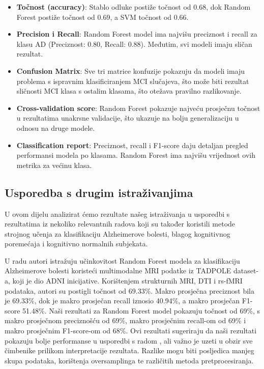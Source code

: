 \documentclass[zavrsnirad,upload]{fer}
\begin{document}
\begin{itemize}
	\item \textbf{Točnost (accuracy)}: Stablo odluke postiže točnost od 0.68, dok Random Forest postiže točnost od 0.69, a SVM točnost od 0.66.
	\item \textbf{Precision i Recall}: Random Forest model ima najvišu preciznost i recall za klasu AD (Preciznost: 0.80, Recall: 0.88). Međutim, svi modeli imaju sličan rezultat.
	\item \textbf{Confusion Matrix}: Sve tri matrice konfuzije pokazuju da modeli imaju problema s ispravnim klasificiranjem MCI slučajeva, što može biti rezultat sličnosti MCI klasa s ostalim klasama, što otežava pravilno razlikovanje.
	\item \textbf{Cross-validation score}: Random Forest pokazuje najveću prosječnu točnost u rezultatima unakrsne validacije, što ukazuje na bolju generalizaciju u odnosu na druge modele.
	\item \textbf{Classification report}: Preciznost, recall i F1-score daju detaljan pregled performansi modela po klasama. Random Forest ima najvišu vrijednost ovih metrika za većinu klasa.
\end{itemize}


\subsection{Usporedba s drugim istraživanjima}

U ovom dijelu analizirat ćemo rezultate našeg istraživanja u usporedbi s rezultatima iz nekoliko relevantnih radova koji su također koristili metode strojnog učenja za klasifikaciju Alzheimerove bolesti, blagog kognitivnog poremećaja i kognitivno normalnih subjekata.

U radu \cite{MultimodalRF} autori istražuju učinkovitost Random Forest modela za klasifikaciju Alzheimerove bolesti koristeći multimodalne MRI podatke iz TADPOLE dataset-a, koji je dio ADNI inicijative. Korištenjem strukturnih MRI, DTI i rs-fMRI podataka, autori su postigli točnost od 69.33\%. Makro prosječna preciznost bila je 69.33\%, dok je makro prosječan recall iznosio 40.94\%, a makro prosječan F1-score 51.48\%. Naši rezultati za Random Forest model pokazuju točnost od 69\%, s makro prosječnom preciznošću od 69\%, makro prosječnim recall-om od 69\% i makro prosječnim F1-score-om od 68\%. Ovi rezultati sugeriraju da naši rezultati pokazuju bolje performanse u usporedbi s radom \cite{MultimodalRF}, ali važno je uzeti u obzir sve čimbenike prilikom interpretacije rezultata. Razlike mogu biti posljedica manjeg skupa podataka, korištenja oversamplinga te različitih metoda pretprocesiranja.
\end{document}
